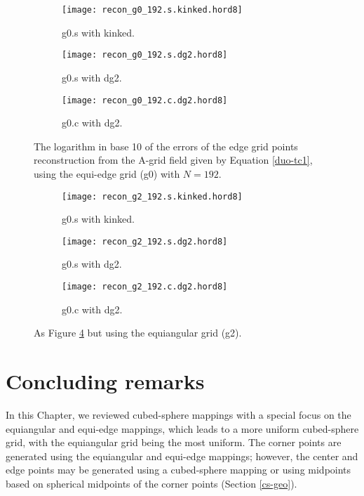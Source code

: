 \newpage
\begin{figure}[!ht]
	\centering
	\begin{subfigure}{0.7\textwidth}
		\centering
		\texttt{[image: recon\_g0\_192.s.kinked.hord8]}
		\caption{g0.s with kinked. \label{recon-errors-g0-s}}
	\end{subfigure}
	
	\begin{subfigure}{0.7\textwidth}
		\centering
		\texttt{[image: recon\_g0\_192.s.dg2.hord8]}
		\caption{g0.s with dg2.\label{recon-errors-g0-s-dg}}
	\end{subfigure}
	
	\begin{subfigure}{0.7\textwidth}
		\centering
		\texttt{[image: recon\_g0\_192.c.dg2.hord8]}
		\caption{g0.c with dg2.\label{recon-errors-g0-c-dg}}
	\end{subfigure}
	\caption{The logarithm in base 10 of the errors of the edge grid points reconstruction from the A-grid field
		given by Equation \eqref{duo-tc1}, using the equi-edge grid (g0) with $N=192$. \label{recon-errors-g0}}
\end{figure}

\newpage
\begin{figure}[!ht]
	\centering
	\begin{subfigure}{0.7\textwidth}
		\centering
		\texttt{[image: recon\_g2\_192.s.kinked.hord8]}
		\caption{g0.s with kinked. \label{recon-errors-g2-s}}
	\end{subfigure}
	
	\begin{subfigure}{0.7\textwidth}
		\centering
		\texttt{[image: recon\_g2\_192.s.dg2.hord8]}
		\caption{g0.s with dg2.\label{recon-errors-g2-s-dg}}
	\end{subfigure}
	
	\begin{subfigure}{0.7\textwidth}
		\centering
		\texttt{[image: recon\_g2\_192.c.dg2.hord8]}
		\caption{g0.c with dg2.\label{recon-errors-g2-c-dg}}
	\end{subfigure}
	\caption{As Figure \ref{recon-errors-g0} but using the equiangular grid (g2). \label{recon-errors-g2}}
\end{figure}

\newpage

\section{Concluding remarks}
\label{cs-conc}
In this Chapter, we reviewed cubed-sphere mappings with a special focus on the equiangular and equi-edge mappings,
which leads to a more uniform cubed-sphere grid, with the equiangular grid being the most uniform.
The corner points are generated using the equiangular and equi-edge mappings;
however, the center and edge points may be generated using a cubed-sphere mapping or using midpoints based on spherical midpoints of the corner points
(Section \ref{cs-geo}).


